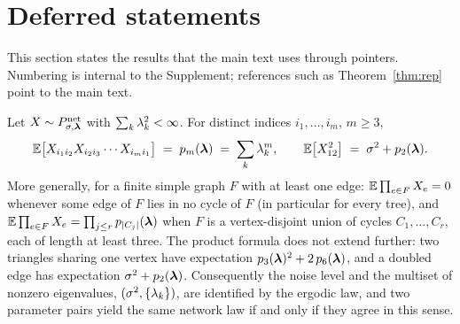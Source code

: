 \section{Deferred statements}
\label{supp:statements}

This section states the results that the main text uses through pointers.
Numbering is internal to the Supplement; references such as
Theorem~\ref{thm:rep} point to the main text.



\begin{proposition}
\label{sprop:ident}
Let $X\sim P^{\mathrm{net}}_{\sigma,\bm{\lambda}}$ with $\sum_k\lambda_k^2<\infty$.
For distinct indices $i_1,\dots,i_m$, $m\ge3$,
\begin{equation*}
\mathbb{E}\bigl[X_{i_1i_2}X_{i_2i_3}\cdots X_{i_mi_1}\bigr] \;=\; p_m(\bm{\lambda})
\;=\;\sum_k \lambda_k^m ,
\qquad
\mathbb{E}\bigl[X_{12}^2\bigr] \;=\; \sigma^2 + p_2(\bm{\lambda}).
\end{equation*}
More generally, for a finite simple graph $F$ with at least one edge:
$\mathbb{E}\prod_{e\in F}X_e=0$ whenever some edge of $F$ lies in no cycle of $F$
(in particular for every tree), and
$\mathbb{E}\prod_{e\in F}X_e=\prod_{j\le r}p_{|C_j|}(\bm{\lambda})$ when $F$ is a
vertex-disjoint union of cycles $C_1,\dots,C_r$, each of length at least
three. The product formula does not extend further: two triangles sharing
one vertex have expectation $p_3(\bm{\lambda})^2+2\,p_6(\bm{\lambda})$, and a doubled
edge has expectation $\sigma^2+p_2(\bm{\lambda})$. Consequently the noise level
and the multiset of nonzero eigenvalues, $(\sigma^2,\{\lambda_k\})$, are
identified by the ergodic law, and two parameter pairs yield the same
network law if and only if they agree in this sense.
\end{proposition}


